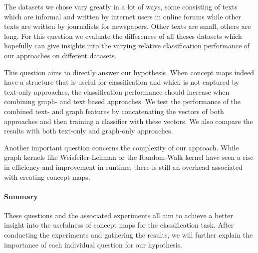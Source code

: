 The datasets we chose vary greatly in a lot of ways, some consisting of texts which are informal and written by internet users in online forums while other texts are written by journalists for newspapers.
Other texts are small, others are long.
For this question we evaluate the differences of all theses datasets which hopefully can give insights into the varying relative classification performance of our approaches on different datasets.

This question aims to directly answer our hypothesis. 
When concept maps indeed have a structure that is useful for classification and which is not captured by text-only approaches, the classification performance should increase when combining graph- and text based approaches.
We test the performance of the combined text- and graph features by concatenating the vectors of both approaches and then training a classifier with these vectors.
We also compare the results with both text-only and graph-only approaches.

Another important question concerns the complexity of our approach.
While graph kernels like Weisfeiler-Lehman or the Random-Walk kernel have seen a rise in efficiency and improvement in runtime, there is still an overhead associated with creating concept maps.

\hspace{2cm}
\paragraph{Summary}
These questions and the associated experiments all aim to achieve a better insight into the usefulness of concept maps for the classification task.
After conducting the experiments and gathering the results, we will further explain the importance of each individual question for our hypothesis.

